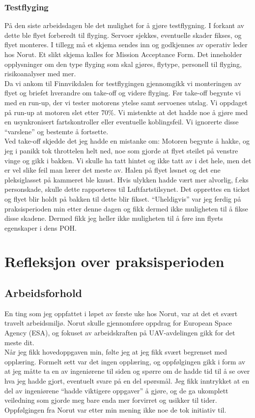 \documentclass[12pt, a4paper]{article}
\begin{document}
\subsubsection{Testflyging}
På den siste arbeidsdagen ble det mulighet for å gjøre testflygning. I forkant av dette ble flyet forberedt til flyging. Servoer sjekkes, eventuelle skader fikses, og flyet monteres. I tillegg må et skjema sendes inn og godkjennes av operativ leder hos Norut. Et slikt skjema kalles for Mission Acceptance Form. Det inneholder opplysninger om den type flyging som skal gjøres, flytype, personell til flyging, risikoanalyser med mer. \\
Da vi ankom til Finnvikdalen for testflygingen gjennomgikk vi monteringen av flyet og  briefet hverandre om take-off og videre flyging. Før take-off begynte vi med en run-up, der vi tester motorens ytelse samt servoenes utslag. Vi oppdaget på run-up at motoren slet etter 
70\%. Vi mistenkte at det hadde noe å gjøre med en usynkronisert fartskontroller eller eventuelle koblingsfeil. Vi ignorerte disse ``varslene'' og bestemte å fortsette. \\
\newpage
Ved take-off skjedde det jeg hadde en mistanke om: Motoren begynte å hakke, og jeg i panikk tok throttelen helt ned, noe som gjorde at flyet steilet på venstre vinge og gikk i bakken. Vi skulle ha tatt hintet og ikke tatt av i det hele, men det er vel slike feil man lærer det meste av. Halen på flyet løsnet og det ene pleksiglasset på kammeret ble knust. 
Hvis ulykken hadde vært mer alvorlig, f.eks personskade, skulle dette rapporteres til Luftfartstilsynet. Det opprettes en ticket og flyet blir holdt på bakken til dette blir fikset. ``Uheldigvis'' var jeg ferdig på praksisperioden min etter denne dagen og fikk dermed ikke muligheten til å fikse disse skadene. Dermed fikk jeg heller ikke muligheten til å føre inn flyets egenskaper i dens POH. 

\newpage
\section{Refleksjon over praksisperioden}
\subsection{Arbeidsforhold}
En ting som jeg oppfattet i løpet av første uke hos Norut, var at det et svært travelt arbeidsmiljø. Norut skulle gjennomføre oppdrag for European Space Agency (ESA), og fokuset av arbeidskraften på UAV-avdelingen gikk for det meste dit.\\
Når jeg fikk hovedoppgaven min, følte jeg at jeg fikk svært begrenset med opplæring. Formelt sett var det ingen opplæring, og oppfølgingen gikk i form av at jeg måtte ta en av ingeniørene til siden og spørre om de hadde tid til å se over hva jeg hadde gjort, eventuelt svare på en del spørsmål. Jeg fikk inntrykket at en del av ingeniørene ``hadde viktigere oppgaver'' å gjøre, og de ga ukomplett veiledning som gjorde meg bare enda mer forvirret og usikker til tider. Oppfølgingen fra Norut var etter min mening ikke noe de tok initiativ til.\\
\end{document}
